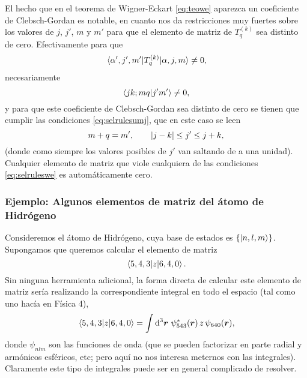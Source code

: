 \documentclass[10pt, a4paper]{article}
\numberwithin{equation}{subsection}
\begin{document}
El hecho que en el teorema de Wigner-Eckart \eqref{eq:teowe} aparezca un
coeficiente de Clebsch-Gordan es notable, en cuanto nos da restricciones muy
fuertes sobre los valores de $j$, $j'$, $m$ y $m'$ para que el elemento de
matriz de $T^{(k)}_q$ sea distinto de cero. Efectivamente para que
\begin{equation}
  \matrixel{\alpha',j',m'}{T^{(k)}_{q}}{\alpha,j,m} \neq 0,
\end{equation}
necesariamente
\begin{equation}
  \braket{jk;mq}{j'm'} \neq 0,
\end{equation}
y para que este coeficiente de Clebsch-Gordan sea distinto de cero se tienen
que cumplir las condiciones \eqref{eq:selrulesumj}, que en este caso se leen
\begin{equation} \label{eq:selruleswe}
  m + q = m', \qquad \abs{j-k} \leq j' \leq j + k,
\end{equation}
(donde como siempre los valores posibles de $j'$ van saltando de a una unidad).
Cualquier elemento de matriz que viole cualquiera de las condiciones
\eqref{eq:selruleswe} es automáticamente cero.

\subsubsection{Ejemplo: Algunos elementos de matriz del átomo de Hidrógeno}

Consideremos el átomo de Hidrógeno, cuya base de estados es
$\set{\ket{n,l,m}}$. Supongamos que queremos calcular el elemento de matriz
\begin{equation}
  \matrixel{5,4,3}{z}{6,4,0}.
\end{equation}
Sin ninguna herramienta adicional, la forma directa de calcular este elemento
de matriz sería realizando la correspondiente integral en todo el espacio (tal
como uno hacía en Física 4),
\begin{equation}
  \matrixel{5,4,3}{z}{6,4,0} =
  \int\dd[3]{\vect{r}}\,\psi^*_{543}(\vect{r})\,z\,\psi_{640}(\vect{r}),
\end{equation}
donde $\psi_{nlm}$ son las funciones de onda (que se pueden factorizar en parte
radial y armónicos esféricos, etc; pero aquí no nos interesa meternos con las
integrales). Claramente este tipo de integrales puede ser en general complicado
de resolver.
\end{document}
